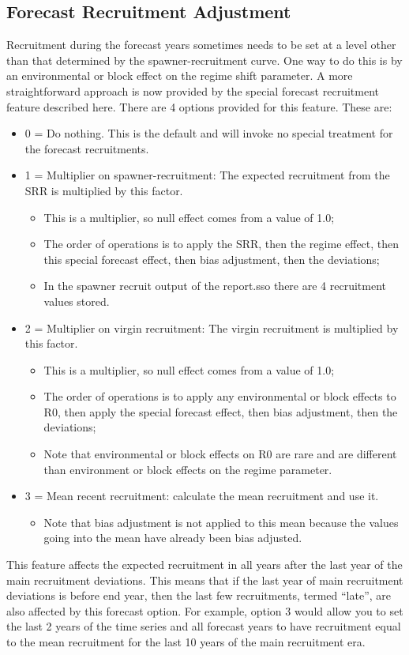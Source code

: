 \subsection{Forecast Recruitment Adjustment}
Recruitment during the forecast years sometimes needs to be set at a level other than that determined by the spawner-recruitment curve.  One way to do this is by an environmental or block effect on the regime shift parameter.  A more straightforward approach is now provided by the special forecast recruitment feature described here. There are 4 options provided for this feature.  These are:
\begin{itemize}
	\item 0 = Do nothing. This is the default and will invoke no special treatment for the forecast recruitments.
	\item 1 = Multiplier on spawner-recruitment:  The expected recruitment from the SRR is multiplied by this factor.
	\begin{itemize}
		\item This is a multiplier, so null effect comes from a value of 1.0;
		\item The order of operations is to apply the SRR, then the regime effect, then this special forecast effect, then bias adjustment, then the deviations;
		\item In the spawner recruit output of the report.sso there are 4 recruitment values stored.
	\end{itemize}
	\item 2 = Multiplier on virgin recruitment:  The virgin recruitment is multiplied by this factor.
	\begin{itemize}
		\item This is a multiplier, so null effect comes from a value of 1.0;
		\item The order of operations is to apply any environmental or block effects to R0, then apply the special forecast effect, then bias adjustment, then the deviations;
		\item Note that environmental or block effects on R0 are rare and are different than environment or block effects on the regime parameter.
	\end{itemize}
	\item 3 = Mean recent recruitment: calculate the mean recruitment and use it.
	\begin{itemize}
		\item Note that bias adjustment is not applied to this mean because the values going into the mean have already been bias adjusted.
	\end{itemize}
\end{itemize}

This feature affects the expected recruitment in all years after the last year of the main recruitment deviations.  This means that if the last year of main recruitment deviations is before end year, then the last few recruitments, termed “late”, are also affected by this forecast option.  For example, option 3 would allow you to set the last 2 years of the time series and all forecast years to have recruitment equal to the mean recruitment for the last 10 years of the main recruitment era.